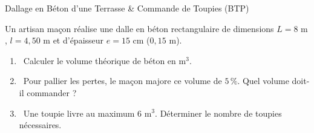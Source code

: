 \begin{exercice}[3 pts][\capRealiser]{Dallage en Béton d'une Terrasse \& Commande de Toupies (BTP)}
\noindent
\begin{minipage}[c]{0.58\linewidth}
Un artisan maçon réalise une dalle en béton rectangulaire de dimensions $L = 8\text{ m}$, $l = 4{,}50\text{ m}$ et d'épaisseur $e = 15\text{ cm}$ ($0{,}15\text{ m}$).
\begin{enumerate}[leftmargin=1.2em, itemsep=1pt]
    \item \capRealiser\ Calculer le volume théorique de béton en $\text{m}^3$.
    \item \capValider\ Pour pallier les pertes, le maçon majore ce volume de \textbf{$5\,\%$}. Quel volume doit-il commander ?
    \item \capRealiser\ Une toupie livre au maximum $6\text{ m}^3$. Déterminer le nombre de toupies nécessaires.
\end{enumerate}
\end{minipage}\hfill
\begin{minipage}[c]{0.38\linewidth}
\centering
{}
\end{minipage}

\vspace{1mm}
\lignesreponse[2]
\end{exercice}

